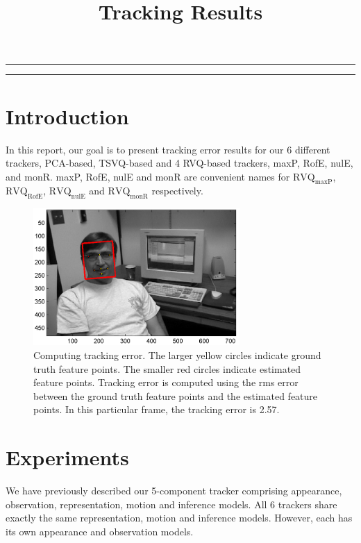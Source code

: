 
\title{Tracking Results}
\date{}

\maketitle
\rule[0pt]{\textwidth}{1pt}
\tableofcontents
\rule[0pt]{\textwidth}{1pt}
\section{Introduction}
In this report, our goal is to present tracking error results for our 6 different trackers, PCA-based, TSVQ-based and 4 RVQ-based trackers, maxP, RofE, nulE, and monR.  maxP, RofE, nulE and monR are convenient names for $\mathrm{RVQ_{maxP}}$, $\mathrm{RVQ_{RofE}}$, $\mathrm{RVQ_{nulE}}$ and $\mathrm{RVQ_{monR}}$ respectively.


								\begin{figure}[t]
								\centering
								\includegraphics[width=0.7\textwidth]{temp/results_pca__trk_dudek_0007.png}
								\caption{Computing tracking error.  The larger yellow circles indicate ground truth feature points.  The smaller red circles indicate estimated feature points.  Tracking error is computed using the rms error between the ground truth feature points and the estimated feature points.  In this particular frame, the tracking error is 2.57.}
								\label{fig:results_pca__trk_dudek_0007}
								\end{figure}
\section{Experiments}
We have previously described our 5-component tracker comprising appearance, observation, representation, motion and inference models.  All 6 trackers share exactly the same representation, motion and inference models.  However, each has its own appearance and observation models.

